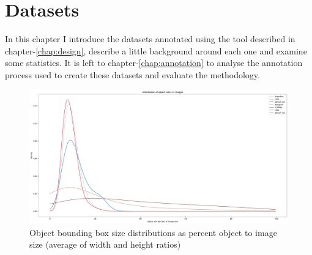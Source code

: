 \chapter{Datasets}
\label{chap:datasets} 

In this chapter I introduce the datasets annotated using the tool described in chapter-\ref{chap:design}, describe a little background around each one and examine some statistics. It is left to chapter-\ref{chap:annotation} to  analyse the annotation process used to create these datasets and evaluate the methodology.





\begin{figure}[ht]
\centering
\includegraphics[width=0.9\linewidth]{charts/summaries/sizes_density.pdf}
\caption{Object bounding box size distributions as percent object to image size (average of width and height ratios) }
\label{fig:box_sizes}
\end{figure}






